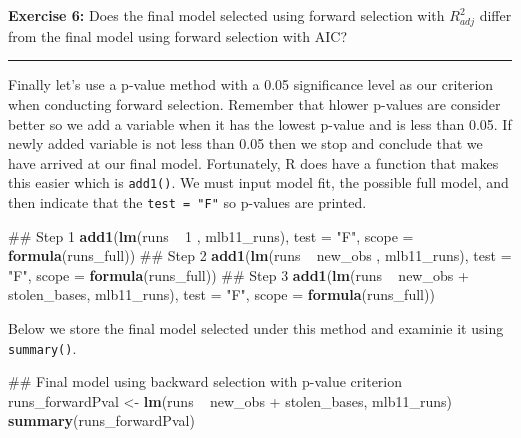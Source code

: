 \documentclass[]{book}
\newenvironment{Shaded}{\begin{snugshade}}{\end{snugshade}}
\newcommand{\KeywordTok}[1]{\textcolor[rgb]{0.13,0.29,0.53}{\textbf{{#1}}}}
\newcommand{\DataTypeTok}[1]{\textcolor[rgb]{0.13,0.29,0.53}{{#1}}}
\newcommand{\DecValTok}[1]{\textcolor[rgb]{0.00,0.00,0.81}{{#1}}}
\newcommand{\StringTok}[1]{\textcolor[rgb]{0.31,0.60,0.02}{{#1}}}
\newcommand{\NormalTok}[1]{{#1}}
\theoremstyle{definition}
\theoremstyle{definition}
\theoremstyle{definition}
\theoremstyle{remark}
\begin{document}
\textbf{Exercise 6:} Does the final model selected using forward
selection with \(R^2_{adj}\) differ from the final model using forward
selection with AIC?

\begin{center}\rule{0.5\linewidth}{\linethickness}\end{center}

Finally let's use a p-value method with a 0.05 significance level as our
criterion when conducting forward selection. Remember that hlower
p-values are consider better so we add a variable when it has the lowest
p-value and is less than 0.05. If newly added variable is not less than
0.05 then we stop and conclude that we have arrived at our final model.
Fortunately, R does have a function that makes this easier which is
\texttt{add1()}. We must input model fit, the possible full model, and
then indicate that the \texttt{test\ =\ "F"} so p-values are printed.

\begin{Shaded}
\begin{Highlighting}[]
\NormalTok{## Step 1}
\KeywordTok{add1}\NormalTok{(}\KeywordTok{lm}\NormalTok{(runs ~}\StringTok{ }\DecValTok{1} \NormalTok{, mlb11_runs), }\DataTypeTok{test =} \StringTok{"F"}\NormalTok{, }\DataTypeTok{scope =} \KeywordTok{formula}\NormalTok{(runs_full))}
\NormalTok{## Step 2}
\KeywordTok{add1}\NormalTok{(}\KeywordTok{lm}\NormalTok{(runs ~}\StringTok{ }\NormalTok{new_obs , mlb11_runs), }\DataTypeTok{test =} \StringTok{"F"}\NormalTok{, }\DataTypeTok{scope =} \KeywordTok{formula}\NormalTok{(runs_full))}
\NormalTok{## Step 3}
\KeywordTok{add1}\NormalTok{(}\KeywordTok{lm}\NormalTok{(runs ~}\StringTok{ }\NormalTok{new_obs +}\StringTok{ }\NormalTok{stolen_bases, mlb11_runs), }\DataTypeTok{test =} \StringTok{"F"}\NormalTok{, }\DataTypeTok{scope =} \KeywordTok{formula}\NormalTok{(runs_full))}
\end{Highlighting}
\end{Shaded}

Below we store the final model selected under this method and examinie
it using \texttt{summary()}.

\begin{Shaded}
\begin{Highlighting}[]
\NormalTok{## Final model using backward selection with p-value criterion}
\NormalTok{runs_forwardPval <-}\StringTok{ }\KeywordTok{lm}\NormalTok{(runs ~}\StringTok{ }\NormalTok{new_obs +}\StringTok{ }\NormalTok{stolen_bases, mlb11_runs)}
\KeywordTok{summary}\NormalTok{(runs_forwardPval)}
\end{Highlighting}
\end{Shaded}
\end{document}
